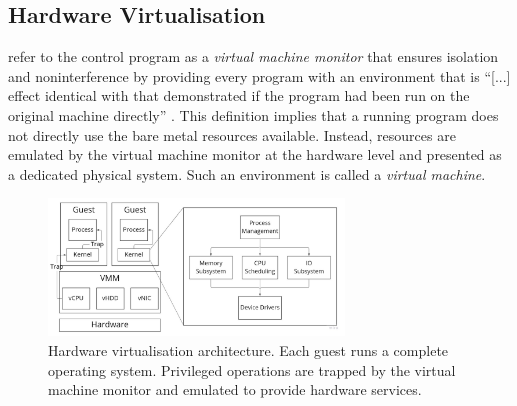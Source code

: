 \subsection{Hardware Virtualisation}
\label{ch:fundamentals/virtualisation/hardware-virtualisation}
\textcite{10.1145/361011.361073} refer to the control program as a \textit{virtual machine monitor} that 
ensures isolation and noninterference by providing every program with an environment that is \enquote{[...] effect
identical with that demonstrated if the program had been run on the original machine directly} 
\cite[2]{10.1145/361011.361073}. This definition implies that a running program does not directly use
the bare metal resources available. Instead, resources are emulated by the virtual machine monitor at
the hardware level and presented as a dedicated physical system. Such an environment is called 
a \textit{virtual machine}.

\begin{figure}[H]
    \centering
    \includegraphics[width=0.70\textwidth]{images/fundamentals/full-virt-archh.jpg}
    \caption{Hardware virtualisation architecture. Each guest runs a complete operating system. 
             Privileged operations are trapped by the virtual machine monitor and emulated to provide hardware services.}
    \label{images:fundamentals/full-virt-archh.jpg}
\end{figure}

